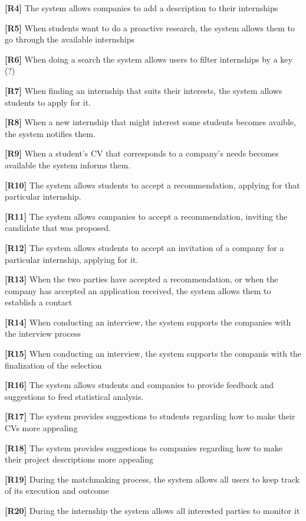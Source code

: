 \textbf{[R4]} The system allows companies to add a description to their internships

\textbf{[R5]} When students want to do a proactive research, the system allows them to go through the available internships

\textbf{[R6]} When doing a search the system allows users to filter internships by a key (?)

\textbf{[R7]} When finding an internship that suits their interests, the system allows students to apply for it. 

\textbf{[R8]} When a new internship that might interest some students becomes avaible, the system notifies them.

\textbf{[R9]} When a student's CV that corresponds to a company's needs becomes available the system informs them. 

\textbf{[R10]} The system allows students to accept a recommendation, applying for that particular internship. 

\textbf{[R11]} The system allows companies to accept a recommendation, inviting the candidate that was proposed.

\textbf{[R12]} The system allows students to accept an invitation of a company for a particular internship, applying for it.

\textbf{[R13]}  When the two parties have accepted a recommendation, or when the company has accepted an application received, the system allows them to establish a contact

\textbf{[R14]} When conducting an interview, the system supports the companies with the interview process

\textbf{[R15]} When conducting an interview, the system supports the companis with the finalization of the selection

\textbf{[R16]} The system allows students and companies to provide feedback and suggestions to feed statistical analysis.

\textbf{[R17] }The system provides suggestions to students regarding how to make their CVs more appealing

\textbf{[R18]} The system provides suggestions to companies regarding how to make their project descriptions more appealing

\textbf{[R19]} During the matchmaking process, the system allows all users to keep track of its execution and outcome

\textbf{[R20]} During the internship the system allows all interested parties to monitor it

